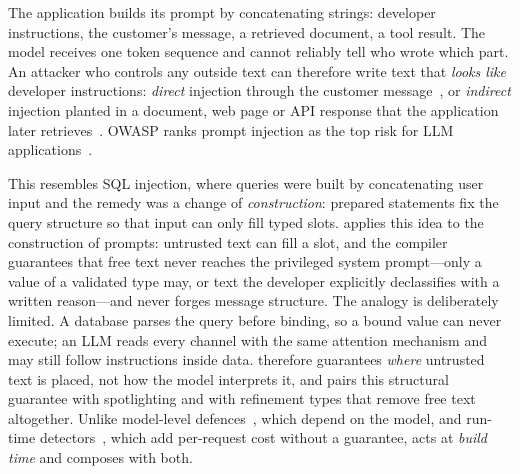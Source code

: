 \documentclass[conference]{IEEEtran}
\begin{document}
The application builds its prompt by concatenating strings: developer instructions, the customer's message, a retrieved document, a tool result. The model receives one token sequence and cannot reliably tell who wrote which part. An attacker who controls any outside text can therefore write text that \emph{looks like} developer instructions: \emph{direct} injection through the customer message~\cite{perez2022ignore}, or \emph{indirect} injection planted in a document, web page or API response that the application later retrieves~\cite{greshake2023indirect}. OWASP ranks prompt injection as the top risk for LLM applications~\cite{owasp2025}.

This resembles SQL injection, where queries were built by concatenating user input and the remedy was a change of \emph{construction}: prepared statements fix the query structure so that input can only fill typed slots. \TL{} applies this idea to the construction of prompts: untrusted text can fill a slot, and the compiler guarantees that free text never reaches the privileged system prompt---only a value of a validated type may, or text the developer explicitly declassifies with a written reason---and never forges message structure. The analogy is deliberately limited. A database parses the query before binding, so a bound value can never execute; an LLM reads every channel with the same attention mechanism and may still follow instructions inside data. \TL{} therefore guarantees \emph{where} untrusted text is placed, not how the model interprets it, and pairs this structural guarantee with spotlighting and with refinement types that remove free text altogether. Unlike model-level defences~\cite{wallace2024hierarchy,chen2025struq,hines2024spotlighting}, which depend on the model, and run-time detectors~\cite{jacob2024promptshield,rebedea2023nemo}, which add per-request cost without a guarantee, \TL{} acts at \emph{build time} and composes with both.
\end{document}
